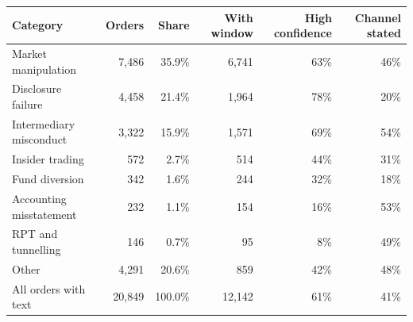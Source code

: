 \begin{tabular*}{\textwidth}[]{l@{\extracolsep\fill}rrrrr}
\toprule
Category & Orders & Share & With window & High confidence & Channel stated\\
\midrule
Market manipulation & 7,486 & 35.9\% & 6,741 & 63\% & 46\%\\
Disclosure failure & 4,458 & 21.4\% & 1,964 & 78\% & 20\%\\
Intermediary misconduct & 3,322 & 15.9\% & 1,571 & 69\% & 54\%\\
Insider trading & 572 & 2.7\% & 514 & 44\% & 31\%\\
Fund diversion & 342 & 1.6\% & 244 & 32\% & 18\%\\
Accounting misstatement & 232 & 1.1\% & 154 & 16\% & 53\%\\
RPT and tunnelling & 146 & 0.7\% & 95 & 8\% & 49\%\\
Other & 4,291 & 20.6\% & 859 & 42\% & 48\%\\
All orders with text & 20,849 & 100.0\% & 12,142 & 61\% & 41\%\\
\bottomrule
\end{tabular*}
